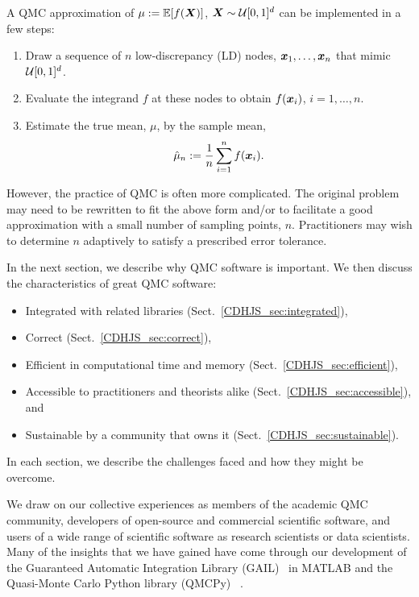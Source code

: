 \documentclass[graybox]{svmult}
\begin{document}
A QMC approximation of $\mu := {\mathbb{E}}[f({\boldsymbol{X}})]$, ${\boldsymbol{X}} \sim {\mathcal{U}}[0,1]^d$ can be implemented in a few steps:
\begin{enumerate}
    \item Draw a sequence of $n$ low-discrepancy (LD) \cite{Nie92, SloJoe94, DicEtal14a, DicEtal22a} nodes,
    ${\boldsymbol{x}}_1,\dots,{\boldsymbol{x}}_n$ that mimic ${\mathcal{U}}[0,1]^d$.
    \item Evaluate the integrand $f$ at these nodes to obtain $f({\boldsymbol{x}}_i)$, $i=1,\dots,n$.
    \item Estimate the true mean, $\mu$, by the sample mean,
    \begin{equation}
        \hat{\mu}_n := \frac{1}{n} \sum_{i=1}^n f(\bsx_i).
        \label{eq:mc_average}
    \end{equation}
\end{enumerate}
However, the practice of QMC is often more complicated.  The original problem may need to be rewritten to fit the above form and/or to facilitate a good approximation with a small number of sampling points, $n$.  Practitioners may wish to determine $n$ adaptively to satisfy a prescribed error tolerance.

In the next section, we describe why QMC software is important.  We then discuss the characteristics of great QMC software:

\begin{itemize}
\item Integrated with related libraries (Sect.\ \ref{CDHJS_sec:integrated}),

\item Correct (Sect.\ \ref{CDHJS_sec:correct}),

\item Efficient in computational time and memory (Sect.\ \ref{CDHJS_sec:efficient}),

\item Accessible to practitioners and theorists alike (Sect.\ \ref{CDHJS_sec:accessible}), and

\item Sustainable by a community that owns it (Sect.\ \ref{CDHJS_sec:sustainable}).

\end{itemize}
In each section, we describe the challenges faced and how they might be overcome.

We draw on our collective experiences as
members of the academic QMC community, developers of open-source and commercial scientific software, and users of a wide range of scientific software as research scientists or data scientists. Many of the insights that we have gained have come through our development of the Guaranteed Automatic Integration Library (GAIL)~\cite{ChoEtal22a} in MATLAB and the Quasi-Monte Carlo Python library (QMCPy)~ \cite{QMCPy2020a}.
\end{document}
